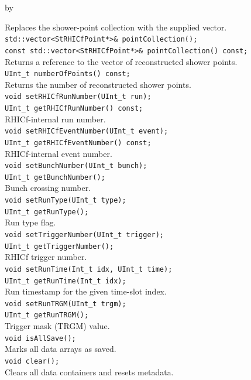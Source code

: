 \documentclass[twoside]{article}
\newcommand{\entrylabel}[1]{\mbox{\textbf{{#1}}}\hfil}%
\newenvironment{entry}
{\begin{list}{}%
    {\renewcommand{\makelabel}{\entrylabel}%
     \setlength{\labelwidth}{90pt}%
     \setlength{\leftmargin}{\labelwidth}
     \advance\leftmargin by \labelsep%
      }%
    }%
  {\end{list}}
\newcommand{\Entrylabel}[1]%
{\raisebox{0pt}[1ex][0pt]{\makebox[\labelwidth][l]%
    {\parbox[t]{\labelwidth}{\hspace{0pt}\textbf{{#1}}}}}}
\newenvironment{Entry}%
{\renewcommand{\entrylabel}{\Entrylabel}\begin{entry}}%
  {\end{entry}}
\begin{document}
\begin{Entry}
    Replaces the shower-point collection with the supplied vector.\\
    \verb+std::vector<StRHICfPoint*>& pointCollection();+\\
    \verb+const std::vector<StRHICfPoint*>& pointCollection() const;+\\
    Returns a reference to the vector of reconstructed shower points.\\
    \verb+UInt_t numberOfPoints() const;+\\
    Returns the number of reconstructed shower points.\\
    \verb+void setRHICfRunNumber(UInt_t run);+\\
    \verb+UInt_t getRHICfRunNumber() const;+\\
    RHICf-internal run number.\\
    \verb+void setRHICfEventNumber(UInt_t event);+\\
    \verb+UInt_t getRHICfEventNumber() const;+\\
    RHICf-internal event number.\\
    \verb+void setBunchNumber(UInt_t bunch);+\\
    \verb+UInt_t getBunchNumber();+\\
    Bunch crossing number.\\
    \verb+void setRunType(UInt_t type);+\\
    \verb+UInt_t getRunType();+\\
    Run type flag.\\
    \verb+void setTriggerNumber(UInt_t trigger);+\\
    \verb+UInt_t getTriggerNumber();+\\
    RHICf trigger number.\\
    \verb+void setRunTime(Int_t idx, UInt_t time);+\\
    \verb+UInt_t getRunTime(Int_t idx);+\\
    Run timestamp for the given time-slot index.\\
    \verb+void setRunTRGM(UInt_t trgm);+\\
    \verb+UInt_t getRunTRGM();+\\
    Trigger mask (TRGM) value.\\
    \verb+void isAllSave();+\\
    Marks all data arrays as saved.\\
    \verb+void clear();+\\
    Clears all data containers and resets metadata.\\
\end{Entry}
\clearpage
\end{document}
